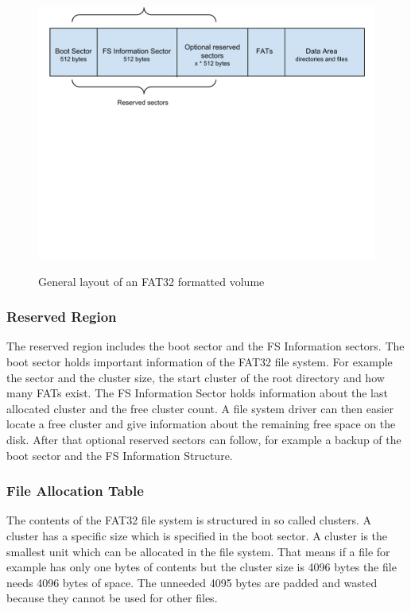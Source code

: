 \begin{figure}[h!]
\caption{General layout of an FAT32 formatted volume}
\centering
\includegraphics[scale=0.62]{figures/fat_general}
\label{figure:general_fat32_layout}
\end{figure}


\subsubsection{Reserved Region}

The reserved region includes the boot sector and the FS Information sectors. The boot sector holds important information of the FAT32 file system. For example the sector and the cluster size, the start cluster of the root directory and how many FATs exist. The FS Information Sector holds information about the last allocated cluster and the free cluster count. A file system driver can then easier locate a free cluster and give information about the remaining free space on the disk. After that optional reserved sectors can follow, for example a backup of the boot sector and the FS Information Structure\cite{usb_ms_jan}.

\subsubsection{File Allocation Table}

The contents of the FAT32 file system is structured in so called clusters. A cluster has a specific size which is specified in the boot sector. A cluster is the smallest unit which can be allocated in the file system. That means if a file for example has only one bytes of contents but the cluster size is 4096 bytes the file needs 4096 bytes of space. The unneeded 4095 bytes are padded and wasted because they cannot be used for other files.


